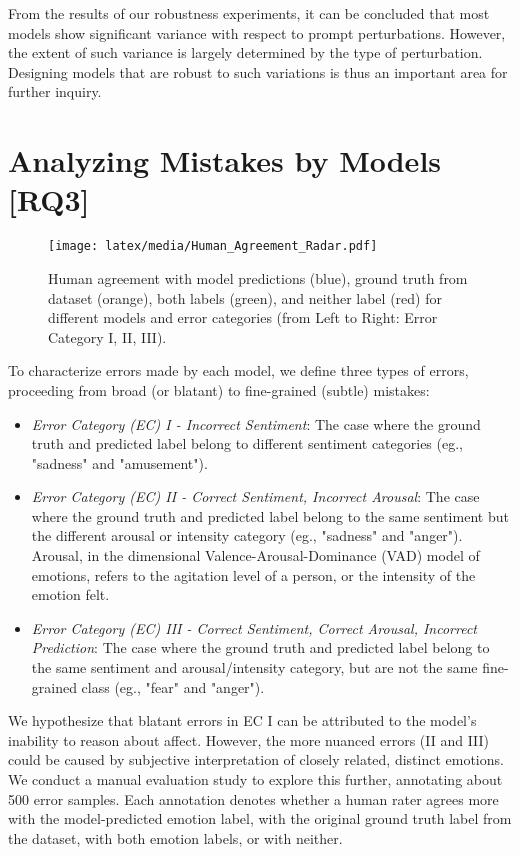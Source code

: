 From the results of our robustness experiments, it can be concluded that most models show significant variance with respect to prompt perturbations. However, the extent of such variance is largely determined by the type of perturbation. Designing models that are robust to such variations is thus an important area for further inquiry.

\section{Analyzing Mistakes by Models [RQ3]}
\label{sec:exp_rq3}

\begin{figure*}[t]
    \centering
    \texttt{[image: latex/media/Human\_Agreement\_Radar.pdf]}
    \caption{Human agreement with model predictions (blue), ground truth from dataset (orange), both labels (green), and neither label (red) for different models and error categories (from Left to Right: Error Category I, II, III).}
    \label{fig:human_agreement}
\end{figure*}

To characterize errors made by each model, we define three types of errors, proceeding from broad (or blatant) to fine-grained (subtle) mistakes: 
\begin{itemize}
    \item \textit{Error Category (EC) I - Incorrect Sentiment}: The case where the ground truth and predicted label belong to different sentiment categories (eg., "sadness" and "amusement"). 
    \item \textit{Error Category (EC) II - Correct Sentiment, Incorrect Arousal}: The case where the ground truth and predicted label belong to the same sentiment but the different arousal or intensity category (eg., "sadness" and "anger"). Arousal, in the dimensional Valence-Arousal-Dominance (VAD) model of emotions, refers to the agitation level of a person, or the intensity of the emotion felt.
    \item \textit{Error Category (EC) III - Correct Sentiment, Correct Arousal, Incorrect Prediction}: The case where the ground truth and predicted label belong to the same sentiment and arousal/intensity category, but are not the same fine-grained class (eg., "fear" and "anger"). 
\end{itemize}

We hypothesize that blatant errors in EC I can be attributed to the model's inability to reason about affect. However, the more nuanced errors (II and III) could be caused by subjective interpretation of closely related, distinct emotions. We conduct a manual evaluation study to explore this further, annotating about 500 error samples. Each annotation denotes whether a human rater agrees more with the model-predicted emotion label, with the original ground truth label from the dataset, with both emotion labels, or with neither. 

